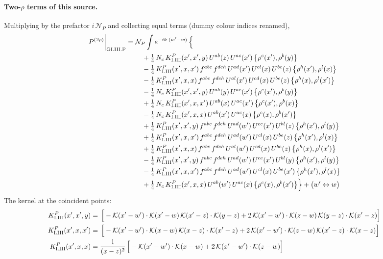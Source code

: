 \documentclass[10pt]{article}
\numberwithin{equation}{section}
\newcommand{\KK}{\mathcal K}
\newcommand{\NP}{\mathcal N_{P}}
\begin{document}
\paragraph{Two-$\rho$ terms of this source.} Multiplying by the prefactor $i\,\NP$ and collecting equal terms (dummy colour indices renamed),
\begin{align}
P^{(2\rho)}\bigg|_{\rm GI.III.P}={}&\NP\int e^{-ik\cdot(w'-w)}\,\Big\{\notag\\
&\quad +\tfrac14\,N_{c}\,K^{P}_{\rm I.III}(x',x',y)\,U^{ab}(z)\,U^{ac}(x')\,\big\{\rho^{c}(x'),\rho^{b}(y)\big\}\notag\\
&\quad -\tfrac14\,K^{P}_{\rm I.III}(x',x,x')\,f^{abc}\,f^{deh}\,U^{ad}(x')\,U^{cl}(x)\,U^{be}(z)\,\big\{\rho^{h}(x'),\rho^{l}(x)\big\}\notag\\
&\quad -\tfrac14\,K^{P}_{\rm I.III}(x',x,x)\,f^{abc}\,f^{deh}\,U^{al}(x')\,U^{cd}(x)\,U^{be}(z)\,\big\{\rho^{h}(x),\rho^{l}(x')\big\}\notag\\
&\quad -\tfrac14\,N_{c}\,K^{P}_{\rm I.III}(x',x',y)\,U^{ab}(y)\,U^{ac}(x')\,\big\{\rho^{c}(x'),\rho^{b}(y)\big\}\notag\\
&\quad +\tfrac14\,N_{c}\,K^{P}_{\rm I.III}(x',x,x')\,U^{ab}(x)\,U^{ac}(x')\,\big\{\rho^{c}(x'),\rho^{b}(x)\big\}\notag\\
&\quad -\tfrac14\,N_{c}\,K^{P}_{\rm I.III}(x',x,x)\,U^{ab}(x')\,U^{ac}(x)\,\big\{\rho^{c}(x),\rho^{b}(x')\big\}\notag\\
&\quad +\tfrac14\,K^{P}_{\rm I.III}(x',x',y)\,f^{abc}\,f^{deh}\,U^{ad}(w')\,U^{ce}(x')\,U^{bl}(z)\,\big\{\rho^{h}(x'),\rho^{l}(y)\big\}\notag\\
&\quad +\tfrac14\,K^{P}_{\rm I.III}(x',x,x')\,f^{abc}\,f^{deh}\,U^{ad}(w')\,U^{cl}(x)\,U^{be}(z)\,\big\{\rho^{h}(x'),\rho^{l}(x)\big\}\notag\\
&\quad +\tfrac14\,K^{P}_{\rm I.III}(x',x,x)\,f^{abc}\,f^{deh}\,U^{al}(w')\,U^{cd}(x)\,U^{be}(z)\,\big\{\rho^{h}(x),\rho^{l}(x')\big\}\notag\\
&\quad -\tfrac14\,K^{P}_{\rm I.III}(x',x',y)\,f^{abc}\,f^{deh}\,U^{ad}(w')\,U^{ce}(x')\,U^{bl}(y)\,\big\{\rho^{h}(x'),\rho^{l}(y)\big\}\notag\\
&\quad -\tfrac14\,K^{P}_{\rm I.III}(x',x,x')\,f^{abc}\,f^{deh}\,U^{ad}(w')\,U^{cl}(x)\,U^{be}(x')\,\big\{\rho^{h}(x'),\rho^{l}(x)\big\}\notag\\
&\quad +\tfrac14\,N_{c}\,K^{P}_{\rm I.III}(x',x,x)\,U^{ab}(w')\,U^{ac}(x)\,\big\{\rho^{c}(x),\rho^{b}(x')\big\}\Big\}+\big(w'\leftrightarrow w\big)\label{eq:res-GI.III.P}
\end{align}
The kernel at the coincident points:
\begin{align*}
K^{P}_{\rm I.III}(x',x',y)&=\,\Big[-\KK(x'-w')\cdot\KK(x'-w)\,\KK(x'-z)\cdot\KK(y-z)+2\,\KK(x'-w')\cdot\KK(z-w)\,\KK(y-z)\cdot\KK(x'-z)\Big]\\K^{P}_{\rm I.III}(x',x,x')&=\,\Big[-\KK(x'-w')\cdot\KK(x-w)\,\KK(x-z)\cdot\KK(x'-z)+2\,\KK(x'-w')\cdot\KK(z-w)\,\KK(x'-z)\cdot\KK(x-z)\Big]\\K^{P}_{\rm I.III}(x',x,x)&=\frac{1}{(x-z)^2}\,\Big[-\KK(x'-w')\cdot\KK(x-w)+2\,\KK(x'-w')\cdot\KK(z-w)\Big]
\end{align*}
\end{document}
